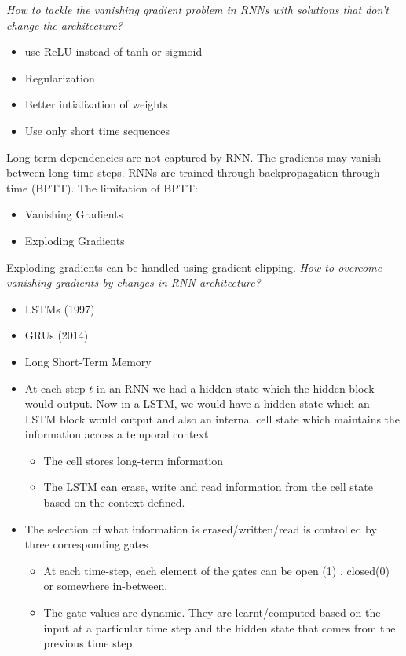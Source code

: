 \documentclass{article}
\begin{document}
\textit{How to tackle the vanishing gradient problem in RNNs with solutions that don't change the architecture?}
\begin{itemize}
    \item use ReLU instead of tanh or sigmoid
    \item Regularization
    \item Better intialization of weights
    \item Use only short time sequences
\end{itemize}
Long term dependencies are not captured by RNN. The gradients may vanish between long time steps. RNNs are trained through backpropagation through time (BPTT).
The limitation of BPTT:
\begin{itemize}
    \item Vanishing Gradients
    \item Exploding Gradients
\end{itemize}
Exploding gradients can be handled using gradient clipping. 
\textit{How to overcome vanishing gradients by changes in  RNN architecture?}
\begin{itemize}
    \item LSTMs (1997)
    \item GRUs (2014)
\end{itemize}
\begin{itemize}
    \item Long Short-Term Memory
    \item At each step $t$ in an RNN we had a hidden state which the hidden block would output. Now in a LSTM, we would have a hidden state which an LSTM block would output and also an internal cell state which maintains the information across a temporal context.
    \begin{itemize}
        \item The cell stores long-term information
        \item The LSTM can erase, write and read information from the cell state based on the context defined.
    \end{itemize}
    \item The selection of what information is erased/written/read is controlled by three corresponding gates
    \begin{itemize}
        \item At each time-step, each element of the gates can be open (1) , closed(0) or somewhere in-between.
        \item The gate values are dynamic. They are learnt/computed based on the input at a particular time step and the hidden state that comes from the previous time step.
    \end{itemize}
\end{itemize}
\end{document}
